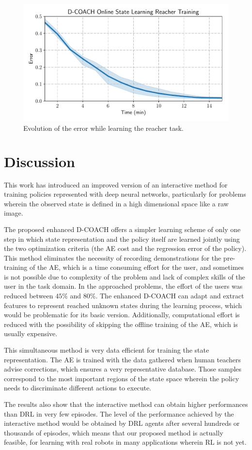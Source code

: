 \begin{figure}[H]
    \centering
    \includegraphics[width=0.9\linewidth]{imagenes/cap3/reacher_ICRA.pdf}
    \caption{Evolution of the error while learning the reacher task. }
    \label{fig:reacher_exp}
\end{figure}

\section{Discussion}

This work has introduced an improved version of an interactive method for training policies represented with deep neural networks, particularly for problems wherein the observed state is defined in a high dimensional space like a raw image.

The proposed enhanced D-COACH offers a simpler learning scheme of only one step in which state representation and the policy itself are learned jointly using the two optimization criteria (the AE cost and the regression error of the policy). This method eliminates the necessity of recording demonstrations for the pre-training of the AE, which is a time consuming effort for the user, and sometimes is not possible due to complexity of the problem and lack of complex skills of the user in the task domain. In the approached problems, the effort of the users was reduced between $45\%$ and $80\%$. The enhanced D-COACH can adapt and extract features to represent reached unknown states during the learning process, which would be problematic for its basic version. Additionally, computational effort is reduced with the possibility of skipping the offline training of the AE, which is usually expensive. 

This simultaneous method is very data efficient for training the state representation. The AE is trained with the data gathered when human teachers advise corrections, which ensures a very representative database. Those samples correspond to the most important regions of the state space wherein the policy needs to discriminate different actions to execute.

The results also show that the interactive method can obtain higher performances than DRL in very few episodes. The level of the performance achieved by the interactive method would be obtained by DRL agents after several hundreds or thousands of episodes, which means that our proposed method is actually feasible, for learning with real robots in many applications wherein RL is not yet.

